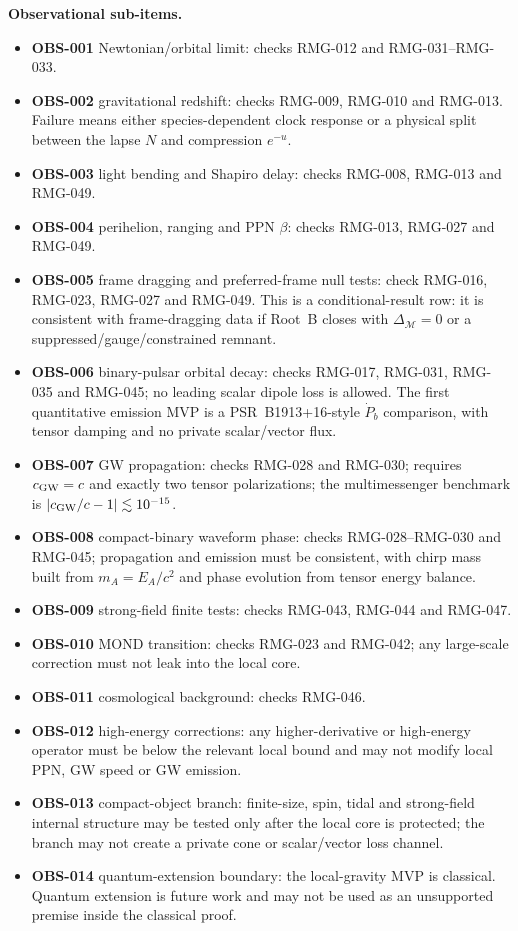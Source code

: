 \documentclass[11pt]{article}
\begin{document}
\medskip\noindent\textbf{Observational sub-items.}
\begin{itemize}
\item \textbf{OBS-001} Newtonian/orbital limit: checks RMG-012 and
RMG-031--RMG-033.
\item \textbf{OBS-002} gravitational redshift: checks RMG-009, RMG-010 and
RMG-013.  Failure means either species-dependent clock response or a physical
split between the lapse \(N\) and compression \(e^{-u}\).
\item \textbf{OBS-003} light bending and Shapiro delay: checks RMG-008,
RMG-013 and RMG-049.
\item \textbf{OBS-004} perihelion, ranging and PPN \(\beta\): checks RMG-013,
RMG-027 and RMG-049.
\item \textbf{OBS-005} frame dragging and preferred-frame null tests: check
RMG-016, RMG-023, RMG-027 and RMG-049.  This is a conditional-result row:
it is consistent with frame-dragging data if Root~B closes with
\(\Delta_{\mathcal M}=0\) or a suppressed/gauge/constrained remnant.
\item \textbf{OBS-006} binary-pulsar orbital decay: checks RMG-017, RMG-031,
RMG-035 and RMG-045; no leading scalar dipole loss is allowed.  The first
quantitative emission MVP is a PSR~B1913+16-style \(\dot P_b\) comparison,
with tensor damping and no private scalar/vector flux.
\item \textbf{OBS-007} GW propagation: checks RMG-028 and RMG-030; requires
\(c_{\rm GW}=c\) and exactly two tensor polarizations; the multimessenger
benchmark is \(|c_{\rm GW}/c-1|\lesssim10^{-15}\).
\item \textbf{OBS-008} compact-binary waveform phase: checks RMG-028--RMG-030
and RMG-045; propagation and emission must be consistent, with chirp mass built
from \(m_A=E_A/c^2\) and phase evolution from tensor energy balance.
\item \textbf{OBS-009} strong-field finite tests: checks RMG-043, RMG-044 and
RMG-047.
\item \textbf{OBS-010} MOND transition: checks RMG-023 and RMG-042; any
large-scale correction must not leak into the local core.
\item \textbf{OBS-011} cosmological background: checks RMG-046.
\item \textbf{OBS-012} high-energy corrections: any higher-derivative or
  high-energy operator must be below the relevant local bound and may not
  modify local PPN, GW speed or GW emission.
\item \textbf{OBS-013} compact-object branch: finite-size, spin, tidal and
  strong-field internal structure may be tested only after the local core is
  protected; the branch may not create a private cone or scalar/vector loss
  channel.
\item \textbf{OBS-014} quantum-extension boundary: the local-gravity MVP is
  classical.  Quantum extension is future work and may not be used as an
  unsupported premise inside the classical proof.
\end{itemize}
\end{document}
